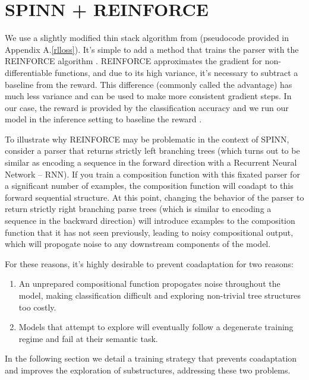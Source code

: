 \documentclass[11pt,a4paper]{article}
\begin{document}
\section{SPINN + REINFORCE}

We use a slightly modified thin stack algorithm from \citet{bowman2016fast}
(pseudocode provided in Appendix A.\ref{rlloss}). It's
simple to add a method that trains the parser with the REINFORCE algorithm
\citep{williams1992simple}. REINFORCE approximates the gradient for non-differentiable
functions, and due to its high variance, it's necessary to subtract a baseline
from the reward. This difference (commonly called the advantage) has much less
variance and can be used to make more consistent gradient steps. In our case,
the reward is provided by the classification accuracy and we run our model in the
inference setting to baseline the reward \citep{rennie2016self}.

To illustrate why REINFORCE may be problematic in the context of SPINN, consider
a parser that returns strictly left branching trees (which turns out to be similar as
encoding a sequence in the forward direction with a Recurrent Neural Network -- RNN).
If you train a composition function with this fixated parser for a significant number
of examples, the composition function will coadapt to this forward sequential structure.
At this point, changing the behavior of the parser to return strictly right branching parse trees
(which is similar to encoding a sequence in the backward direction) will introduce examples
to the composition function that it has not seen previously, leading to noisy compositional
output, which will propogate noise to any downstream components of the model.

For these reasons, it's highly desirable to prevent coadaptation for two reasons:

\begin{enumerate}
\item
An unprepared compositional function propogates noise throughout the model, making
classification difficult and exploring non-trivial tree structures too costly.
\item
Models that attempt to explore will eventually follow a degenerate training regime and
fail at their semantic task.
\end{enumerate}

In the following section we detail a training strategy that prevents coadaptation and
improves the exploration of substructures, addressing these two problems.
\end{document}

